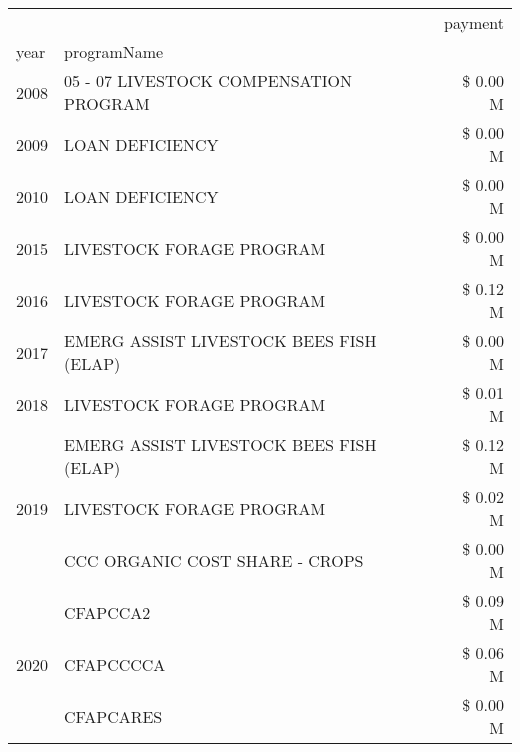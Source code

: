 \begin{tabular}{llr}
\toprule
 &  & payment \\
year & programName &  \\
\midrule
2008 & 05 - 07 LIVESTOCK COMPENSATION PROGRAM & \$ 0.00 M \\
\cline{1-3}
2009 & LOAN DEFICIENCY & \$ 0.00 M \\
\cline{1-3}
2010 & LOAN DEFICIENCY & \$ 0.00 M \\
\cline{1-3}
2015 & LIVESTOCK FORAGE PROGRAM & \$ 0.00 M \\
\cline{1-3}
2016 & LIVESTOCK FORAGE PROGRAM & \$ 0.12 M \\
\cline{1-3}
2017 & EMERG ASSIST LIVESTOCK BEES FISH (ELAP) & \$ 0.00 M \\
\cline{1-3}
2018 & LIVESTOCK FORAGE PROGRAM & \$ 0.01 M \\
\cline{1-3}
\multirow[t]{3}{*}{2019} & EMERG ASSIST LIVESTOCK BEES FISH (ELAP) & \$ 0.12 M \\
 & LIVESTOCK FORAGE PROGRAM & \$ 0.02 M \\
 & CCC ORGANIC COST SHARE - CROPS & \$ 0.00 M \\
\cline{1-3}
\multirow[t]{3}{*}{2020} & CFAPCCA2 & \$ 0.09 M \\
 & CFAPCCCCA & \$ 0.06 M \\
 & CFAPCARES & \$ 0.00 M \\
\cline{1-3}
\bottomrule
\end{tabular}
